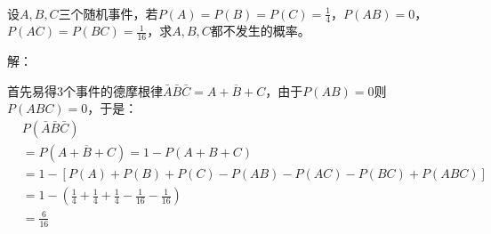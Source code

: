 ~

\begin{example}
设$A,B,C$三个随机事件，若$P\left( A \right) =P\left( B \right) =P\left( C \right) =\frac{1}{4}$，$P\left( AB \right) =0$，$P\left( AC \right) =P\left( BC \right) =\frac{1}{16}$，求$A,B,C$都不发生的概率。
\end{example}

解：

首先易得3个事件的德摩根律$\bar{A}\bar{B}\bar{C}=\overline{A+B+C}$，由于$P\left( AB \right) =0$则$P\left( ABC \right) =0$，于是：
\begin{align*}
&P\left( \bar{A}\bar{B}\bar{C} \right) \\
&=P\left( \overline{A+B+C} \right) =1-P\left( A+B+C \right) \\
&=1-\left[ P\left( A \right) +P\left( B \right) +P \left( C \right) -P\left( AB \right) -P\left( AC \right) -P\left( BC \right) +P\left( ABC \right) \right] \\
&=1-\left( \frac{1}{4}+\frac{1}{4}+\frac{1}{4}-\frac{1}{16}-\frac{1}{16} \right) \\
&=\frac{6}{16}
\end{align*}




